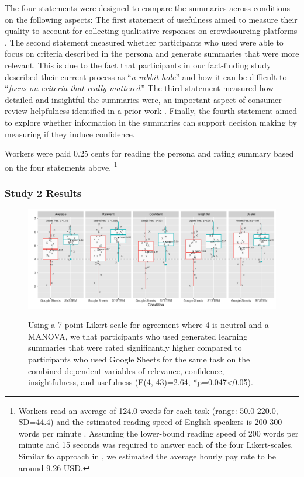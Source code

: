The four statements were designed to compare the summaries across conditions on the following aspects: The first statement of usefulness aimed to measure their quality to account for collecting qualitative responses on crowdsourcing platforms \cite{kittur2008crowdsourcing}. The second statement measured whether participants who used \SYSTEM were able to focus on criteria described in the persona and generate summaries that were more relevant.  This is due to the fact that participants in our fact-finding study described their current process as ``\emph{a rabbit hole}'' and how it can be difficult to ``\emph{focus on criteria that really mattered}.'' The third statement measured how detailed and insightful the summaries were, an important aspect of consumer review helpfulness identified in a prior work \cite{mudambi2010research}. Finally, the fourth statement aimed to explore whether information in the summaries can support decision making by measuring if they induce confidence. 

Workers were paid 0.25 cents for reading the persona and rating summary based on the four statements above. \footnote{Workers read an average of 124.0 words for each task (range: 50.0-220.0, SD=44.4) and the estimated reading speed of English speakers is 200-300 words per minute \cite{siegenthaler2012reading}. Assuming the lower-bound reading speed of 200 words per minute and 15 seconds was required to answer each of the four Likert-scales. Similar to approach in \cite{10.1145/3313831.3376715}, we estimated the average hourly pay rate to be around 9.26 USD.} 


\subsubsection{Study 2 Results}

\begin{figure}
    \centering
    \textcolor{gray}{\includegraphics[width=1\textwidth]{Chapters/Mesh/figures/Subjective.png}}
    \caption[Mean statistics for the subjective criteria study.]{Using a 7-point Likert-scale for agreement where 4 is neutral and a MANOVA, we that participants who used \SYSTEM generated learning summaries that were rated significantly higher compared to participants who used Google Sheets for the same task on the combined dependent variables of  relevance, confidence, insightfulness, and usefulness (F(4, 43)=2.64, *p=0.047<0.05).}
    \label{fig:subjective}
\end{figure}

